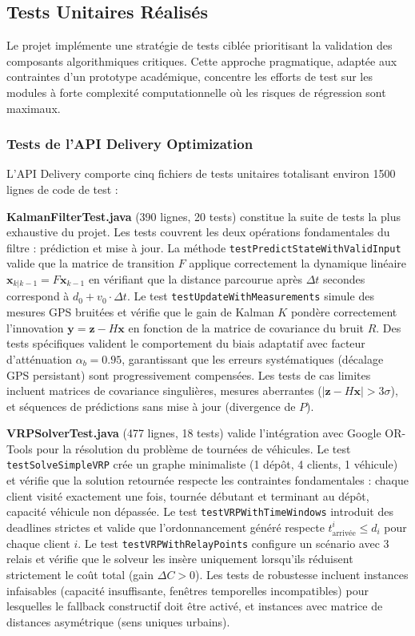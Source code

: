 \subsection{Tests Unitaires Réalisés}

Le projet implémente une stratégie de tests ciblée prioritisant la validation des composants algorithmiques critiques. Cette approche pragmatique, adaptée aux contraintes d'un prototype académique, concentre les efforts de test sur les modules à forte complexité computationnelle où les risques de régression sont maximaux.

\subsubsection{Tests de l'API Delivery Optimization}

L'API Delivery comporte cinq fichiers de tests unitaires totalisant environ 1500 lignes de code de test :

\textbf{KalmanFilterTest.java} (390 lignes, 20 tests) constitue la suite de tests la plus exhaustive du projet. Les tests couvrent les deux opérations fondamentales du filtre : prédiction et mise à jour. La méthode \texttt{testPredictStateWithValidInput} valide que la matrice de transition $F$ applique correctement la dynamique linéaire $\mathbf{x}_{k|k-1} = F \mathbf{x}_{k-1}$ en vérifiant que la distance parcourue après $\Delta t$ secondes correspond à $d_0 + v_0 \cdot \Delta t$. Le test \texttt{testUpdateWithMeasurements} simule des mesures GPS bruitées et vérifie que le gain de Kalman $K$ pondère correctement l'innovation $\mathbf{y} = \mathbf{z} - H\mathbf{x}$ en fonction de la matrice de covariance du bruit $R$. Des tests spécifiques valident le comportement du biais adaptatif avec facteur d'atténuation $\alpha_b = 0.95$, garantissant que les erreurs systématiques (décalage GPS persistant) sont progressivement compensées. Les tests de cas limites incluent matrices de covariance singulières, mesures aberrantes ($|\mathbf{z} - H\mathbf{x}| > 3\sigma$), et séquences de prédictions sans mise à jour (divergence de $P$).

\textbf{VRPSolverTest.java} (477 lignes, 18 tests) valide l'intégration avec Google OR-Tools pour la résolution du problème de tournées de véhicules. Le test \texttt{testSolveSimpleVRP} crée un graphe minimaliste (1 dépôt, 4 clients, 1 véhicule) et vérifie que la solution retournée respecte les contraintes fondamentales : chaque client visité exactement une fois, tournée débutant et terminant au dépôt, capacité véhicule non dépassée. Le test \texttt{testVRPWithTimeWindows} introduit des deadlines strictes et valide que l'ordonnancement généré respecte $t_{\text{arrivée}}^i \leq d_i$ pour chaque client $i$. Le test \texttt{testVRPWithRelayPoints} configure un scénario avec 3 relais et vérifie que le solveur les insère uniquement lorsqu'ils réduisent strictement le coût total (gain $\Delta C > 0$). Les tests de robustesse incluent instances infaisables (capacité insuffisante, fenêtres temporelles incompatibles) pour lesquelles le fallback constructif doit être activé, et instances avec matrice de distances asymétrique (sens uniques urbains).

